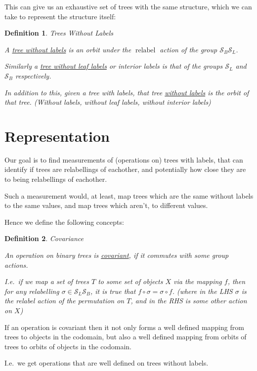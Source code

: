 \documentclass[10pt,a4paper]{report}
\DeclareMathOperator{\relabel}{relabel}
\newcommand{\Sym}{\mathcal{S}}
\newtheorem{definition}{Definition}
\begin{document}
This can give us an exhaustive set of trees with the same structure, which we
can take to represent the structure itself:

\begin{definition} Trees Without Labels

	A \underline{tree without labels} is an orbit under the $\relabel$ action of the group ${\Sym_B}{\Sym_L}$.

	Similarly a \underline{tree without leaf labels} or interior labels is that of the groups $\Sym_L$ and $\Sym_B$ respectively.

	In addition to this, given a tree with labels, \emph{that} tree
	\underline{without labels} is the orbit of that tree. (Without labels,
	without leaf labels, without interior labels)
\end{definition}

\section{Representation}

Our goal is to find measurements of (operations on) trees with labels, that can identify if trees are
relabellings of eachother, and potentially how close they are to being
relabellings of eachother.

Such a measurement would, at least, map trees which are the same without labels to the
same values, and map trees which aren't, to different values.

Hence we define the following concepts:

\begin{definition} Covariance

	An operation on binary trees is \underline{covariant}, if it commutes with some group actions.

	I.e.\ if we map a set of trees $T$ to some set of objects $X$ via the
	mapping $f$, then for any relabelling $\sigma \in \Sym_L\Sym_B$, it is true
	that $f \circ \sigma = \sigma \circ f$. (where in the LHS $\sigma$ is the
	relabel action of the permutation on $T$, and in the RHS is some other action on $X$)
\end{definition}

If an operation is covariant then it not only forms a well defined mapping from
trees to objects in the codomain, but also a well defined mapping
from orbits of trees to orbits of objects in the codomain.

I.e.\ we get operations that are well defined on trees without labels.
\end{document}
